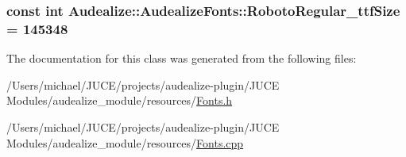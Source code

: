 \subsubsection[{\texorpdfstring{Roboto\+Regular\+\_\+ttf\+Size}{RobotoRegular_ttfSize}}]{\setlength{\rightskip}{0pt plus 5cm}const {\bf int} Audealize\+::\+Audealize\+Fonts\+::\+Roboto\+Regular\+\_\+ttf\+Size = 145348\hspace{0.3cm}{\ttfamily [static]}}\hypertarget{class_audealize_1_1_audealize_fonts_a39ba7d9c918c682a7551e41d3dc15ae7}{}\label{class_audealize_1_1_audealize_fonts_a39ba7d9c918c682a7551e41d3dc15ae7}


The documentation for this class was generated from the following files\+:\begin{DoxyCompactItemize}
\item 
/\+Users/michael/\+J\+U\+C\+E/projects/audealize-\/plugin/\+J\+U\+C\+E Modules/audealize\+\_\+module/resources/\hyperlink{_fonts_8h}{Fonts.\+h}\item 
/\+Users/michael/\+J\+U\+C\+E/projects/audealize-\/plugin/\+J\+U\+C\+E Modules/audealize\+\_\+module/resources/\hyperlink{_fonts_8cpp}{Fonts.\+cpp}\end{DoxyCompactItemize}

